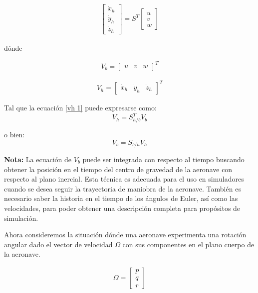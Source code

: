 \begin{gather}
\label{vh 1}
    \begin{bmatrix}
    \dot x_{h}\\
    \dot y_{h}\\
    \dot z_{h}
    \end{bmatrix}
    =
    S^T
    \begin{bmatrix}
    u\\
    v\\
    w
    \end{bmatrix}
\end{gather}

dónde

\begin{gather}
    V_{b}
    =
    \begin{bmatrix}
    u & v & w 
    \end{bmatrix}^T
\end{gather}

\begin{gather}
    V_{h}
    =
    \begin{bmatrix}
    \dot x_{h} & \dot y_{h} & \dot z_{h} 
    \end{bmatrix}^T
\end{gather}

Tal que la ecuación \ref{vh 1} puede expresarse como:
\begin{equation}
    V_{h} = S_{h/b}^{T} V_{b}
\end{equation}

o bien:
\begin{equation}
    V_{b} = S_{b/h} V_{h}
\end{equation}


\textbf{Nota:} La ecuación de $V_{b}$ puede ser integrada con respecto al tiempo buscando obtener la posición en el tiempo del centro de gravedad de la aeronave con respecto al plano inercial. Esta técnica es adecuada para el uso en simuladores cuando se desea seguir la trayectoria de maniobra de la aeronave.
También es necesario saber la historia en el tiempo de los ángulos de Euler, así como las velocidades, para poder obtener una descripción completa para propósitos de simulación.

\medskip

Ahora consideremos la situación dónde una aeronave experimenta una rotación angular dado el vector de velocidad $\Omega$ con sus componentes en el plano cuerpo de la aeronave.

\begin{gather}
    \Omega
    =
    \begin{bmatrix}
    p\\
    q\\
    r
    \end{bmatrix}
\end{gather}

